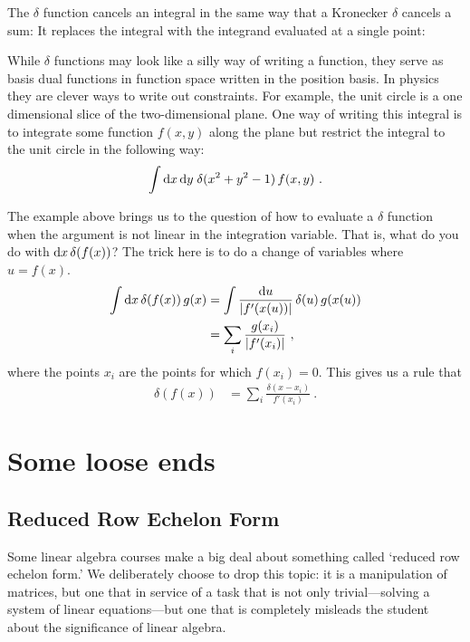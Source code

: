\documentclass[12pt, oneside]{report}    %
\let\oldsection\section
\def\section{%
  \setcounter{sidenote}{1}%
  \oldsection
}
\begin{document}
\begin{subappendices}
The $\delta$ function cancels an integral in the same way that a Kronecker $\delta$ cancels a sum: It replaces the integral with the integrand evaluated at a single point:

While $\delta$ functions may look like a silly way of writing a function, they serve as basis dual functions in function space written in the position basis. In physics they are clever ways to write out constraints. For example, the unit circle is a one dimensional slice of the two-dimensional plane. One way of writing this integral is to integrate some function $f(x,y)$ along the plane but restrict the integral to the unit circle in the following way:
\begin{align}
    \int \operatorname{d}\!{x}\operatorname{d}\!{y}\; \delta(x^2 + y^2 - 1) \, f(x,y) \ .
\end{align}

The example above brings us to the question of how to evaluate a $\delta$ function when the argument is not linear in the integration variable. That is, what do you do with $\operatorname{d}\!{x}\, \delta(f(x))$? The trick here is to do a change of variables where $u = f(x)$.
\begin{align}
    \int \operatorname{d}\!{x}\, \delta(f(x))\, g(x)
    &= 
    \int \frac{\operatorname{d}\!{u}}{|f'(x(u))|} \, \delta(u) \, g(x(u))
    \\
    &= \sum_i\frac{g(x_i)}{|f'(x_i)|} \ ,
\end{align}
where the points $x_i$ are the points for which $f(x_i) = 0$. This gives us a rule that
\begin{align}
    \delta(f(x)) &= \sum_i \frac{\delta(x-x_i)}{f'(x_i)} \ .
\end{align}






\end{subappendices}


\chapter{Some loose ends}


\section{Reduced Row Echelon Form}

Some linear algebra courses make a big deal about something called `reduced row echelon form.' We deliberately choose to drop this topic: it is a manipulation of matrices, but one that in service of a task that is not only trivial---solving a system of linear equations---but one that is completely misleads the student about the significance of linear algebra.
\end{document}
